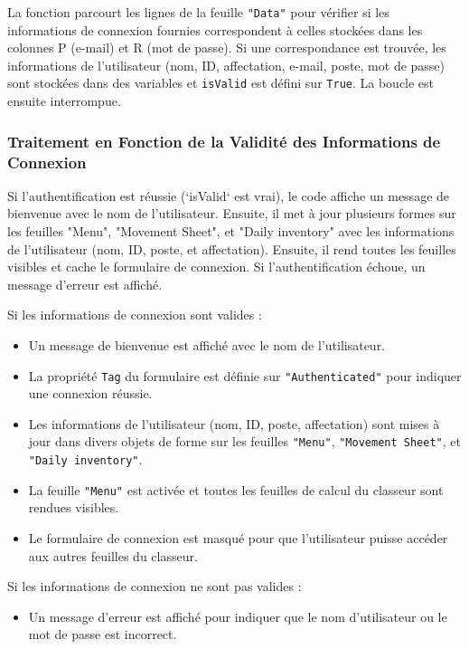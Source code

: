 \documentclass[a4paper, oneside, 12pt, final]{extreport}
\begin{document}
La fonction parcourt les lignes de la feuille \texttt{"Data"} pour vérifier si les informations de connexion fournies correspondent à celles stockées dans les colonnes P (e-mail) et R (mot de passe). Si une correspondance est trouvée, les informations de l'utilisateur (nom, ID, affectation, e-mail, poste, mot de passe) sont stockées dans des variables et \texttt{isValid} est défini sur \texttt{True}. La boucle est ensuite interrompue.

\subsubsection{Traitement en Fonction de la Validité des Informations de Connexion}
Si l'authentification est réussie (`isValid` est vrai), le code affiche un message de bienvenue avec le nom de l'utilisateur. Ensuite, il met à jour plusieurs formes sur les feuilles "Menu", "Movement Sheet", et "Daily inventory" avec les informations de l'utilisateur (nom, ID, poste, et affectation). Ensuite, il rend toutes les feuilles visibles et cache le formulaire de connexion. Si l'authentification échoue, un message d'erreur est affiché.

Si les informations de connexion sont valides :
\begin{itemize}
    \item Un message de bienvenue est affiché avec le nom de l'utilisateur.
    \item La propriété \texttt{Tag} du formulaire est définie sur \texttt{"Authenticated"} pour indiquer une connexion réussie.
    \item Les informations de l'utilisateur (nom, ID, poste, affectation) sont mises à jour dans divers objets de forme sur les feuilles \texttt{"Menu"}, \texttt{"Movement Sheet"}, et \texttt{"Daily inventory"}.
    \item La feuille \texttt{"Menu"} est activée et toutes les feuilles de calcul du classeur sont rendues visibles.
    \item Le formulaire de connexion est masqué pour que l'utilisateur puisse accéder aux autres feuilles du classeur.
\end{itemize}

Si les informations de connexion ne sont pas valides :
\begin{itemize}
    \item Un message d'erreur est affiché pour indiquer que le nom d'utilisateur ou le mot de passe est incorrect.
\end{itemize}
\end{document}
